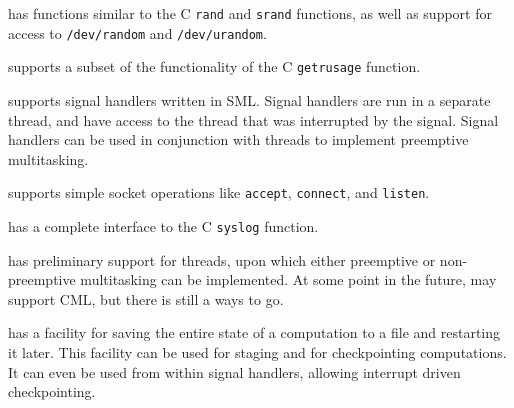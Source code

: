 \begin{description}
\begin{description}
{\mlton} has functions similar to the C {\tt rand} and {\tt srand} functions, as
well as support for access to {\tt /dev/random} and {\tt /dev/urandom}.

{\mlton} supports a subset of the functionality of the C {\tt getrusage}
function.

{\mlton} supports signal handlers written in SML.  Signal handlers are 
run in a separate thread, and have access to the thread that was
interrupted by the signal.  Signal handlers can be used in conjunction with
threads to implement preemptive multitasking.

{\mlton} supports simple socket operations like {\tt accept}, 
{\tt connect}, and {\tt listen}.

{\mlton} has a complete interface to the C {\tt syslog} function.

{\mlton} has preliminary support for threads, upon which either
preemptive or non-preemptive multitasking can be implemented.  At some
point in the future, {\mlton} may support CML, but there is still a
ways to go.

{\mlton} has a facility for saving the entire state of a computation
to a file and restarting it later.  This facility can be used for
staging and for checkpointing computations.  It can even be used from
within signal handlers, allowing interrupt driven checkpointing.

\end{description}
\end{description}

